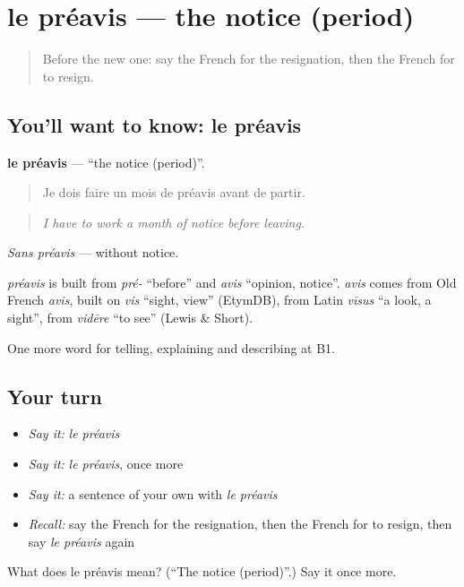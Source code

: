 \section[le préavis]{le préavis — the notice (period)}

\label{lesson:FR-C355-preavis}



\begin{quote}
Before the new one: say the French for the resignation, then the French for to resign.
\end{quote}

\subsection*{You'll want to know: le préavis}
\textbf{le préavis} — \textquotedblleft{}the notice (period)\textquotedblright{}.

\begin{quote}
Je dois faire un mois de préavis avant de partir.
\end{quote}

\begin{quote}
\emph{I have to work a month of notice before leaving.}
\end{quote}

\emph{Sans préavis} — without notice.

\begin{cousinweb}
\emph{préavis} is built from \emph{pré-} \textquotedblleft{}before\textquotedblright{} and \emph{avis} \textquotedblleft{}opinion, notice\textquotedblright{}. \emph{avis} comes from Old French \emph{avis}, built on \emph{vis} \textquotedblleft{}sight, view\textquotedblright{} (EtymDB), from Latin \emph{vīsus} \textquotedblleft{}a look, a sight\textquotedblright{}, from \emph{vidēre} \textquotedblleft{}to see\textquotedblright{} (Lewis \& Short).
\end{cousinweb}

\begin{grammarlens}[title={What you've built}]
One more word for telling, explaining and describing at B1.
\end{grammarlens}

\subsection*{Your turn}
\begin{itemize}
\raggedright
  \item \emph{Say it:} \emph{le préavis}
  \item \emph{Say it:} \emph{le préavis}, once more
  \item \emph{Say it:} a sentence of your own with \emph{le préavis}
  \item \emph{Recall:} say the French for the resignation, then the French for to resign, then say \emph{le préavis} again
\end{itemize}

\begin{tcolorbox}[breakable,colback=teal!4,colframe=teal!35!black,title={Before you move on}]
What does le préavis mean? (\textquotedblleft{}The notice (period)\textquotedblright{}.) Say it once more.
\end{tcolorbox}
